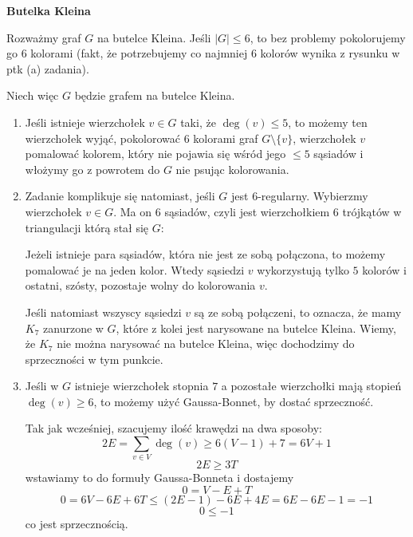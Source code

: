 \begin{enumerate}[label=\textbf{(\alph*)}]
    \textbf{Butelka Kleina} \dotfill

  Rozważmy graf $G$ na butelce Kleina. Jeśli $|G|\leq 6$, to bez problemy pokolorujemy go $6$ kolorami (fakt, że potrzebujemy co najmniej $6$ kolorów wynika z rysunku w ptk (a) zadania). 

  Niech więc $G$ będzie grafem na butelce Kleina. 
  \begin{enumerate}[label=\arabic*]
    \item Jeśli istnieje wierzchołek $v\in G$ taki, że $\deg(v)\leq 5$, to możemy ten wierzchołek wyjąć, pokolorować $6$ kolorami graf $G\setminus \{v\}$, wierzchołek $v$ pomalować kolorem, który nie pojawia się wśród jego $\leq 5$ sąsiadów i włożymy go z powrotem do $G$ nie psując kolorowania.

    \item Zadanie komplikuje się natomiast, jeśli $G$ jest $6$-regularny. Wybierzmy wierzchołek $v\in G$. Ma on $6$ sąsiadów, czyli jest wierzchołkiem $6$ trójkątów w triangulacji którą stał się $G$:
  \begin{center}\end{center}
  Jeżeli istnieje para sąsiadów, która nie jest ze sobą połączona, to możemy pomalować je na jeden kolor. Wtedy sąsiedzi $v$ wykorzystują tylko $5$ kolorów i ostatni, szósty, pozostaje wolny do kolorowania $v$. 

  Jeśli natomiast wszyscy sąsiedzi $v$ są ze sobą połączeni, to oznacza, że mamy $K_7$ zanurzone w $G$, które z kolei jest narysowane na butelce Kleina. Wiemy, że $K_7$ nie można narysować na butelce Kleina, więc dochodzimy do sprzeczności w tym punkcie.
\item Jeśli w $G$ istnieje wierzchołek stopnia $7$ a pozostałe wierzchołki mają stopień $\deg(v)\geq6$, to możemy użyć Gaussa-Bonnet, by dostać sprzeczność.

  Tak jak wcześniej, szacujemy ilość krawędzi na dwa sposoby:
  $$2E= \sum_{v\in V}\deg(v)\geq 6(V-1)+7=6V+1$$
  $$2E\geq 3T$$
  wstawiamy to do formuły Gaussa-Bonneta i dostajemy
  $$0=V-E+T$$
  $$0=6V-6E+6T\leq (2E-1)-6E+4E=6E-6E-1=-1$$
  $$0\leq -1$$
  co jest sprzecznością.
\end{enumerate}
\end{enumerate}
